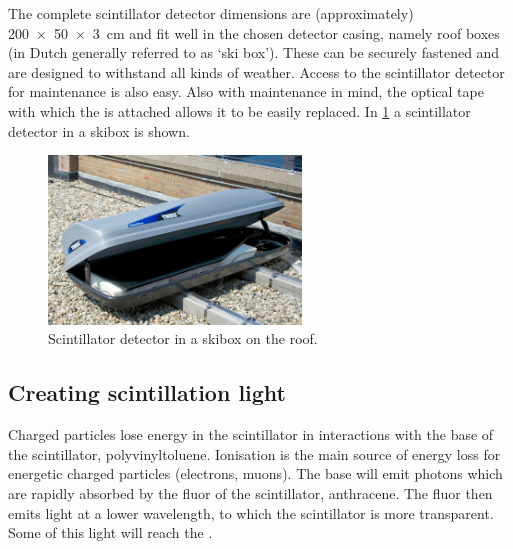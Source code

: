 The complete scintillator detector dimensions are (approximately) \SI[product-units=power]{200 x 50 x 3}{\centi\meter} and fit well in the chosen detector casing, namely roof boxes (in Dutch generally referred to as `ski box'). These can be securely fastened and are designed to withstand all kinds of weather. Access to the scintillator detector for maintenance is also easy. Also with maintenance in mind, the optical tape with which the \pmt is attached allows it to be easily replaced. In \cref{fig:detector_in_skibox} a scintillator detector in a skibox is shown.

\begin{figure}
    \centering
    \includegraphics[width=0.6\textwidth]
                    {plots/station/ADL_105036.jpg}
    \caption{Scintillator detector in a skibox on the roof.}
    \label{fig:detector_in_skibox}
\end{figure}


\subsection{Creating scintillation light}

Charged particles lose energy in the scintillator in interactions with the base of the scintillator, polyvinyltoluene. Ionisation is the main source of energy loss for energetic charged particles (electrons, muons). The base will emit photons which are rapidly absorbed by the fluor of the scintillator, anthracene. The fluor then emits light at a lower wavelength, to which the scintillator is more transparent. Some of this light will reach the \pmt.

